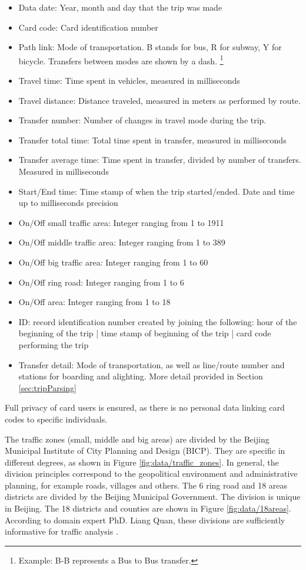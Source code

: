 \documentclass{article}
\begin{document}
\begin{itemize}
\item Data date: Year, month and day that the trip was made
\item Card code: Card identification number
\item Path link: Mode of transportation. B stands for bus, R for subway, Y for bicycle. Transfers between modes are shown by a dash. \footnote{Example: B-B represents a Bus to Bus transfer.} 
\item Travel time: Time spent in vehicles, measured in milliseconds
\item Travel distance: Distance traveled, measured in meters as performed by route. 
\item Transfer number: Number of changes in travel mode during the trip. 
\item Transfer total time: Total time spent in transfer, measured in milliseconds\item Transfer average time: Time spent in transfer, divided by number of transfers. Measured in milliseconds
\item Start/End time: Time stamp of when the trip started/ended. Date and time up to milliseconds precision
\item On/Off small traffic area: Integer ranging from 1 to 1911
\item On/Off middle traffic area: Integer ranging from 1 to 389
\item On/Off big traffic area: Integer ranging from 1 to 60
\item On/Off ring road: Integer ranging from 1 to 6
\item On/Off area: Integer ranging from 1 to 18
\item ID: record identification number created by joining the following: hour of the beginning of the trip | time stamp of beginning of the trip | card code performing the trip
\item Transfer detail: Mode of transportation, as well as line/route number and stations for boarding and alighting. More detail provided in Section \ref{sec:tripParsing}
\end{itemize}

Full privacy of card users is ensured, as there is no personal data linking card codes to specific individuals. 

The traffic zones (small, middle and big areas) are divided by the Beijing Municipal Institute of City Planning and Design (BICP). They are specific in different degrees, as shown in Figure \ref{fig:data/traffic_zones}. In general, the division principles correspond to the geopolitical environment and administrative planning, for example roads, villages and others. The 6 ring road and 18 areas districts are divided by the Beijing Municipal Government. The division is unique in Beijing. The 18 districts and counties are shown in Figure \ref{fig:data/18areas}. According to domain expert PhD. Liang Quan, these divisions are sufficiently informative for traffic analysis \cite{liang}.
\end{document}
